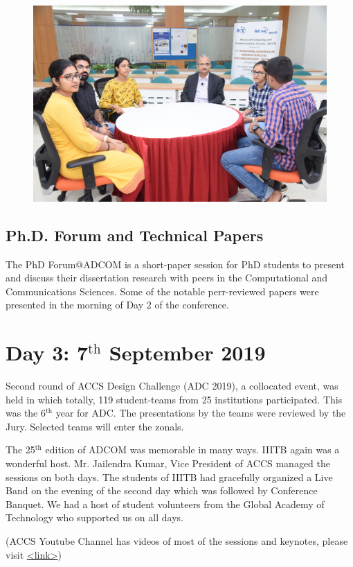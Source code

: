 \begin{multicols}{2}
\begin{figure}[H]
\centering
\includegraphics[scale=.9]{src/Figures/events/event-fig05.jpg}
\vspace{-2ex}
\end{figure}

\vspace{-.5cm}

\noindent
\subsection*{Ph.D. Forum and Technical Papers}

The PhD Forum@ADCOM is a short-paper session for PhD students to present and discuss their dissertation research with peers in the Computational and Communications Sciences. Some of the notable perr-reviewed papers were presented in the morning of Day 2 of the conference.


\section*{Day 3: 7$^{\text{th}}$ September 2019}

Second round of ACCS Design Challenge (ADC 2019), a collocated event, was held in which totally, 119 student-teams from 25 institutions participated. This was the 6$^{\text{th}}$ year for ADC. The presentations by the teams were reviewed by the Jury. Selected teams will enter the zonals.

The 25$^{\text{th}}$ edition of ADCOM was memorable in many ways. IIITB again was a wonderful host. Mr. Jailendra Kumar, Vice President of ACCS managed the sessions on both days. The students of IIITB had gracefully organized a Live Band on the evening of the second day which was followed by Conference Banquet. We had a host of student volunteers from the Global Academy of Technology who supported us on all days.

(ACCS Youtube Channel has videos of most of the sessions and keynotes, please visit \url{<link>})
\end{multicols}
